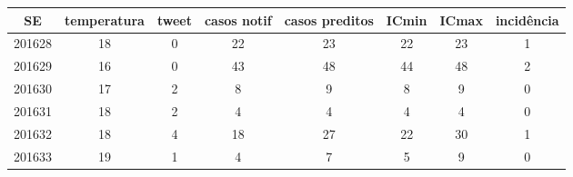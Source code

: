 \begin{tabular}{c|ccccccc}
  \hline
SE & temperatura & tweet & casos notif & casos preditos & ICmin & ICmax & incidência \\ 
  \hline
201628 & 18 & 0 & 22 & 23 & 22 & 23 & 1 \\ 
  201629 & 16 & 0 & 43 & 48 & 44 & 48 & 2 \\ 
  201630 & 17 & 2 & 8 & 9 & 8 & 9 & 0 \\ 
  201631 & 18 & 2 & 4 & 4 & 4 & 4 & 0 \\ 
  201632 & 18 & 4 & 18 & 27 & 22 & 30 & 1 \\ 
  201633 & 19 & 1 & 4 & 7 & 5 & 9 & 0 \\ 
   \hline
\end{tabular}
